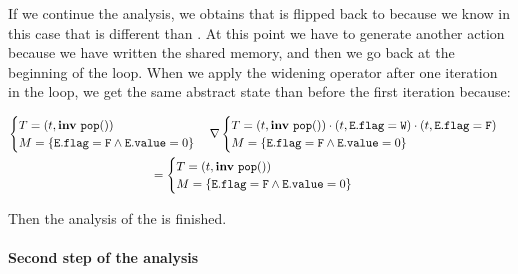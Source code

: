 If we continue the analysis, we obtains that  is flipped back to  because we know in this case that  is different than . At this point we have to generate another action because we have written the shared memory, and then we go back at the beginning of the loop. 
When we apply the widening operator after one iteration in the loop, we get the same abstract state than before the first iteration because:
\begin{scriptsize}
\begin{multline*}
\begin{cases}
	T = (t, \mathbf{inv}\ \mathtt{pop}())\\
	M = \{\mathtt{E.flag} = \mathtt{F} \wedge \mathtt{E.value} = 0\}
\end{cases}
\nabla
\begin{cases}
	T =  (t, \mathbf{inv}\ \mathtt{pop}())\cdot(t, \mathtt{E.flag=W})\cdot (t, \mathtt{E.flag=F})\\
	M = \{\mathtt{E.flag} = \mathtt{F} \wedge \mathtt{E.value} = 0\}
\end{cases} \\ =
\begin{cases}
	T = (t, \mathbf{inv}\ \mathtt{pop}())\\
	M = \{\mathtt{E.flag} = \mathtt{F} \wedge \mathtt{E.value} = 0\}
\end{cases}
\end{multline*} 
\end{scriptsize}
Then the analysis of the  is finished. 

\paragraph{Second step of the analysis}

